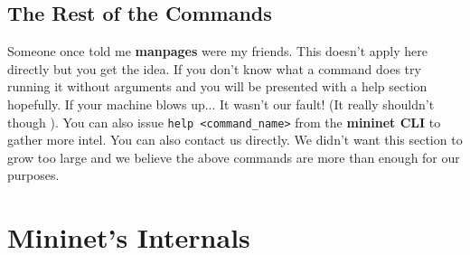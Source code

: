 \documentclass[12pt]{report}
\begin{document}
		\subsection{The Rest of the Commands}
			Someone once told me \textbf{manpages} were my friends. This doesn't apply here directly but you get the idea. If you don't know what a command does try running it without arguments and you will be presented with a help section hopefully. If your machine blows up... It wasn't our fault! (It really shouldn't though  ). You can also issue \texttt{help <command\_name>} from the \textbf{mininet CLI} to gather more intel. You can also contact us directly. We didn't want this section to grow too large and we believe the above commands are more than enough for our purposes.

	\section{Mininet's Internals}
\end{document}
